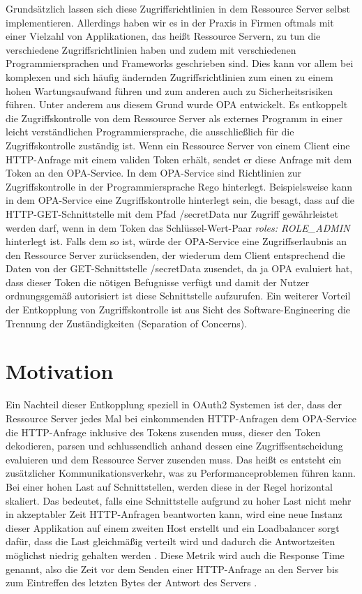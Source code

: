 Grundsätzlich lassen sich diese Zugriffsrichtlinien in dem Ressource Server selbst implementieren. Allerdings haben wir es in der Praxis in Firmen oftmals mit einer Vielzahl von Applikationen, das heißt Ressource Servern, zu tun die verschiedene Zugriffsrichtlinien haben und zudem mit verschiedenen Programmiersprachen und Frameworks geschrieben sind. Dies kann vor allem bei komplexen und sich häufig ändernden Zugriffsrichtlinien zum einen zu einem hohen Wartungsaufwand führen und zum anderen auch zu Sicherheitsrisiken führen. 
Unter anderem aus diesem Grund wurde \ac{OPA} entwickelt. Es entkoppelt die Zugriffskontrolle von dem Ressource Server als externes Programm in einer leicht verständlichen Programmiersprache, die ausschließlich für die Zugriffskontrolle zuständig ist. Wenn ein Ressource Server von einem Client eine HTTP-Anfrage mit einem validen Token erhält, sendet er diese Anfrage mit dem Token an den OPA-Service. In dem OPA-Service sind Richtlinien zur Zugriffskontrolle in der Programmiersprache Rego hinterlegt. Beispielsweise kann in dem OPA-Service eine Zugriffskontrolle hinterlegt sein, die besagt, dass auf die HTTP-GET-Schnittstelle mit dem Pfad /secretData nur Zugriff gewährleistet werden darf, wenn in dem Token das Schlüssel-Wert-Paar \emph{roles: ROLE\_ADMIN} hinterlegt ist. Falls dem so ist, würde der OPA-Service eine Zugriffserlaubnis an den Ressource Server zurücksenden, der wiederum dem Client entsprechend die Daten von der GET-Schnittstelle /secretData zusendet, da ja OPA evaluiert hat, dass dieser Token die nötigen Befugnisse verfügt und damit der Nutzer ordnungsgemäß autorisiert ist diese Schnittstelle aufzurufen. Ein weiterer Vorteil der Entkopplung von Zugriffskontrolle ist aus Sicht des Software-Engineering die Trennung der Zuständigkeiten (Separation of Concerns). 

%
%
\section{Motivation}
\label{sec:intro:motivation}
Ein Nachteil dieser Entkopplung speziell in OAuth2 Systemen ist der, dass der Ressource Server jedes Mal bei einkommenden HTTP-Anfragen dem OPA-Service die HTTP-Anfrage inklusive des Tokens zusenden muss, dieser den Token dekodieren, parsen und schlussendlich anhand dessen eine Zugriffsentscheidung evaluieren und dem Ressource Server zusenden muss. Das heißt es entsteht ein zusätzlicher Kommunikationsverkehr, was zu Performanceproblemen führen kann. Bei einer hohen Last auf Schnittstellen, werden diese in der Regel horizontal skaliert. Das bedeutet, falls eine Schnittstelle aufgrund zu hoher Last nicht mehr in akzeptabler Zeit HTTP-Anfragen beantworten kann, wird eine neue Instanz dieser Applikation auf einem zweiten Host erstellt und ein Loadbalancer sorgt dafür, dass die Last gleichmäßig verteilt wird und dadurch die Antwortzeiten möglichst niedrig gehalten werden \citep{kubernetes:2020}. Diese Metrik wird auch die Response Time genannt, also die Zeit vor dem Senden einer HTTP-Anfrage an den Server bis zum Eintreffen des letzten Bytes der Antwort des Servers \citep{jmeterglossary:2021}.\smallskip

